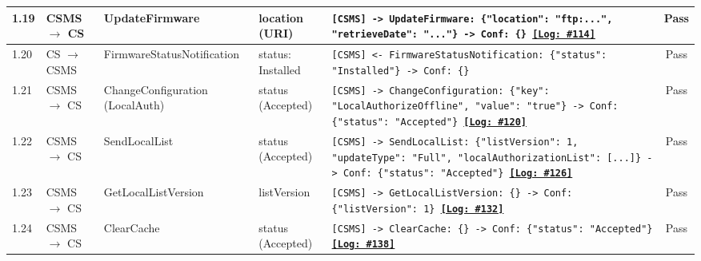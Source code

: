 \documentclass[10pt, a4paper, landscape]{article}
\begin{document}
\begin{longtable}{|p{1.0cm}|p{2.5cm}|p{4.0cm}|p{5.0cm}|p{10.0cm}|c|}
\hline
1.19 & CSMS $\to$ CS & UpdateFirmware & location (URI) & \footnotesize\texttt{[CSMS] -> UpdateFirmware: \{"location": "ftp:...", "retrieveDate": "..."\} \newline [CS] -> Conf: \{\} \newline \hyperref[log:1.19]{\textbf{[Log: \#114]}}} & Pass \\
\hline
1.20 & CS $\to$ CSMS & FirmwareStatusNotification & status: Installed & \footnotesize\texttt{[CSMS] <- FirmwareStatusNotification: \{"status": "Installed"\} \newline [CSMS] -> Conf: \{\}} & Pass \\
\hline
1.21 & CSMS $\to$ CS & ChangeConfiguration (LocalAuth) & status (Accepted) & \footnotesize\texttt{[CSMS] -> ChangeConfiguration: \{"key": "LocalAuthorizeOffline", "value": "true"\} \newline [CS] -> Conf: \{"status": "Accepted"\} \newline \hyperref[log:1.21]{\textbf{[Log: \#120]}}} & Pass \\
\hline
1.22 & CSMS $\to$ CS & SendLocalList & status (Accepted) & \footnotesize\texttt{[CSMS] -> SendLocalList: \{"listVersion": 1, "updateType": "Full", "localAuthorizationList": [...]\} \newline [CS] -> Conf: \{"status": "Accepted"\} \newline \hyperref[log:1.22]{\textbf{[Log: \#126]}}} & Pass \\
\hline
1.23 & CSMS $\to$ CS & GetLocalListVersion & listVersion & \footnotesize\texttt{[CSMS] -> GetLocalListVersion: \{\} \newline [CS] -> Conf: \{"listVersion": 1\} \newline \hyperref[log:1.23]{\textbf{[Log: \#132]}}} & Pass \\
\hline
1.24 & CSMS $\to$ CS & ClearCache & status (Accepted) & \footnotesize\texttt{[CSMS] -> ClearCache: \{\} \newline [CS] -> Conf: \{"status": "Accepted"\} \newline \hyperref[log:1.24]{\textbf{[Log: \#138]}}} & Pass \\
\hline


\end{longtable}
\end{document}
